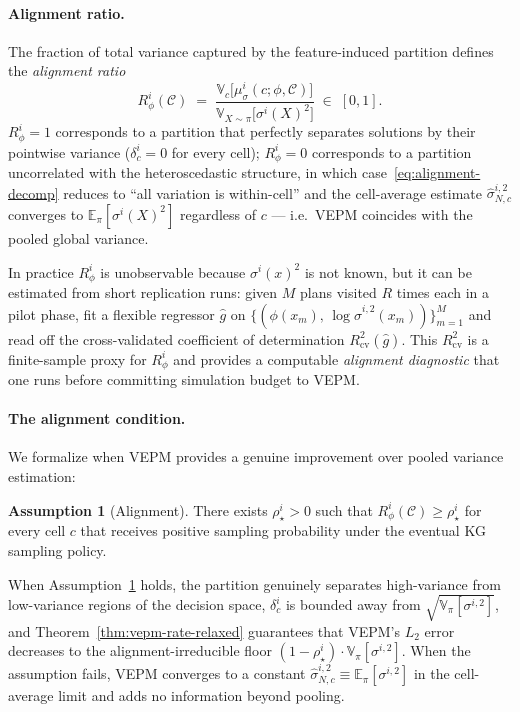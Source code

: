 \documentclass[12pt]{article}
\theoremstyle{plain}
\theoremstyle{definition}
\newtheorem{assumption}{Assumption}[section]
\theoremstyle{remark}
\begin{document}
\paragraph{Alignment ratio.}
The fraction of total variance captured by the feature-induced partition
defines the \emph{alignment ratio}
\begin{equation}\label{eq:alignment-ratio}
  R_\phi^{i}(\mathcal{C})
    \;=\;
    \frac{\mathbb{V}_{c}\!\bigl[\mu_\sigma^{i}(c;\phi,\mathcal{C})\bigr]}
         {\mathbb{V}_{X\sim\pi}\!\bigl[\sigma^{i}(X)^{2}\bigr]}
    \;\in\;[0,1].
\end{equation}
$R_\phi^{i}=1$ corresponds to a partition that perfectly separates
solutions by their pointwise variance ($\delta_c^i=0$ for every cell);
$R_\phi^{i}=0$ corresponds to a partition uncorrelated with the
heteroscedastic structure, in which case~\eqref{eq:alignment-decomp}
reduces to ``all variation is within-cell'' and the cell-average
estimate $\hat\sigma^{i,2}_{N,c}$ converges to
$\mathbb{E}_\pi[\sigma^{i}(X)^{2}]$ regardless of $c$ --- i.e.\ VEPM
coincides with the pooled global variance.

In practice $R_\phi^{i}$ is unobservable because $\sigma^{i}(x)^{2}$ is
not known, but it can be estimated from short replication runs: given
$M$ plans visited $R$ times each in a pilot phase, fit a flexible
regressor $\hat g$ on
$\{(\phi(x_m),\, \log\hat\sigma^{i,2}(x_m))\}_{m=1}^M$ and read off the
cross-validated coefficient of determination $R^{2}_{\mathrm{cv}}(\hat g)$.
This $R^{2}_{\mathrm{cv}}$ is a finite-sample proxy for $R_\phi^{i}$ and
provides a computable \emph{alignment diagnostic} that one runs before
committing simulation budget to VEPM.

\paragraph{The alignment condition.}
We formalize when VEPM provides a genuine improvement over pooled
variance estimation:

\begin{assumption}[Alignment]\label{asm:alignment}
There exists $\rho^{i}_\star > 0$ such that
$R_\phi^{i}(\mathcal{C}) \ge \rho^{i}_\star$ for every cell $c$ that
receives positive sampling probability under the eventual KG sampling
policy.
\end{assumption}

When Assumption~\ref{asm:alignment} holds, the partition genuinely
separates high-variance from low-variance regions of the decision
space, $\delta_c^i$ is bounded away from
$\sqrt{\mathbb{V}_\pi[\sigma^{i,2}]}$, and
Theorem~\ref{thm:vepm-rate-relaxed} guarantees that VEPM's $L_2$ error
decreases to the alignment-irreducible floor
$(1-\rho^{i}_\star)\cdot\mathbb{V}_\pi[\sigma^{i,2}]$.  When the
assumption fails, VEPM converges to a constant
$\hat\sigma^{i,2}_{N,c}\equiv\mathbb{E}_\pi[\sigma^{i,2}]$ in the
cell-average limit and adds no information beyond pooling.
\end{document}
